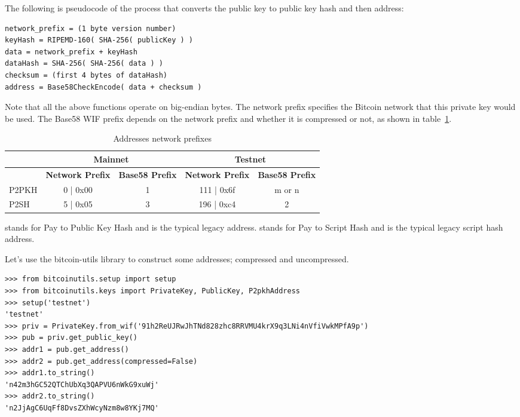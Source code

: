The following is pseudocode of the process that converts the public key to public key hash and then address:

\begin{emphbox}
\begin{lstlisting}
network_prefix = (1 byte version number)
keyHash = RIPEMD-160( SHA-256( publicKey ) )
data = network_prefix + keyHash
dataHash = SHA-256( SHA-256( data ) )
checksum = (first 4 bytes of dataHash)
address = Base58CheckEncode( data + checksum )
\end{lstlisting}
\end{emphbox}

Note that all the above functions operate on big-endian bytes. The network prefix specifies the Bitcoin network that this private key would be used. The Base58 WIF prefix depends on the network prefix and whether it is compressed or not, as shown in table~\ref{tab:address-prefixes}.

\begin{table}[h]
\centering
\begin{tabular}{ |l|c|c|c|c| }
\hline
~ & \multicolumn{2}{c|}{\textbf{Mainnet}} & \multicolumn{2}{c|}{\textbf{Testnet}} \\
\hline
~ & \textbf{Network Prefix} & \textbf{Base58 Prefix} & \textbf{Network Prefix} & \textbf{Base58 Prefix} \\
\hline
P2PKH & 0 | 0x00 & 1 & 111 | 0x6f & m or n \\
\hline
P2SH & 5 | 0x05 & 3 & 196 | 0xc4 & 2 \\
\hline
\end{tabular}
\caption{Addresses network prefixes}
\label{tab:address-prefixes}
\end{table}

	 stands for Pay to Public Key Hash and is the typical legacy address.  stands for Pay to Script Hash and is the typical legacy script hash address.

Let's use the bitcoin-utils library to construct some addresses; compressed and uncompressed.

\vspace{1em}
\begin{lstlisting}[style=Python,label={lst:display-public-keys},caption={Example of getting compressed and uncompressed public keys using Python},captionpos=b]
>>> from bitcoinutils.setup import setup
>>> from bitcoinutils.keys import PrivateKey, PublicKey, P2pkhAddress
>>> setup('testnet')
'testnet' 
>>> priv = PrivateKey.from_wif('91h2ReUJRwJhTNd828zhc8RRVMU4krX9q3LNi4nVfiVwkMPfA9p')
>>> pub = priv.get_public_key()  
>>> addr1 = pub.get_address()
>>> addr2 = pub.get_address(compressed=False)
>>> addr1.to_string()
'n42m3hGC52QTChUbXq3QAPVU6nWkG9xuWj' 
>>> addr2.to_string() 
'n2JjAgC6UqFf8DvsZXhWcyNzm8w8YKj7MQ'
\end{lstlisting}
\vspace{1em}

